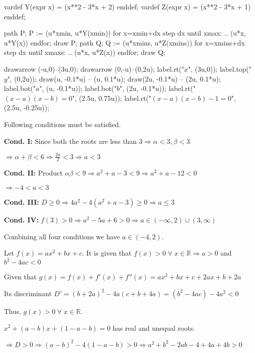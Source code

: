       vardef Y(expr x) = (x**2 - 3*x + 2) enddef;
      vardef Z(expr x) = (x**2 - 3*x + 1) enddef;

      path P;
      P := (u*xmin, u*Y(xmin))
      for x=xmin+dx step dx until xmax:
      .. (u*x, u*Y(x))
      endfor;
      draw P;
      path Q;
      Q := (u*xmins, u*Z(xmins))
      for x=xmins+dx step dx until xmaxs:
      .. (u*x, u*Z(x))
      endfor;
      draw Q;

      drawarrow (-u,0)--(3u,0);
      drawarrow (0,-u)--(0,2u);
      label.rt("$x$", (3u,0));
      label.top("$y$", (0,2u));
      draw(u, -0.1*u) -- (u, 0.1*u);
      draw(2u, -0.1*u) -- (2u, 0.1*u);
      label.bot("$a$", (u, -0.1*u));
      label.bot("$b$", (2u, -0.1*u));
      label.rt("$(x - a)(x - b) = 0$", (2.5u, 0.75u));
      label.rt("$(x - a)(x - b) - 1 = 0$", (2.5u, -0.25u));
    \stopMPcode
  \stopplacefigure
\item Following conditions must be satisfied.

  {\bf Cond. I:} Since both the roots are less than $3\Rightarrow \alpha < 3, \beta < 3$

  $\Rightarrow \alpha + \beta < 6 \Rightarrow \frac{2a}{2} < 3\Rightarrow a < 3$

  {\bf Cond. II:} Product $\alpha\beta < 9 \Rightarrow a^2 + a - 3 < 9 \Rightarrow a^2 + a - 12 <0$

  $\Rightarrow -4 < a < 3$

  {\bf Cond. III:} $D \geq 0 \Rightarrow 4a^2 - 4(a^2 + a - 3)\geq 0\Rightarrow a\leq 3$

  {\bf Cond. IV:} $f(3) > 0 \Rightarrow a^2 - 5a + 6 > 0 \Rightarrow a\in(-\infty, 2)\cup (3, \infty)$

  Combining all four conditions we have $a\in(-4, 2)$.
\item Let $f(x) = ax^2 + bx + c$. It is given that $f(x) > 0\;\forall\;x\in\mathbb{R}\Rightarrow a > 0$ and
  $b^2 - 4ac < 0$

  Given that $g(x) = f(x) + f'(x) + f''(x) = ax^2 + bx + c + 2ax + b + 2a$

  Its discriminant $D' = (b + 2a)^2 - 4a(c + b + 4a) = (b^2 - 4ac) - 4a^2 < 0$

  Thus, $g(x) > 0\;\forall\;x\in\mathbb{R}$.
\item $x^2 + (a - b)x + (1 - a - b) = 0$ has real and unequal roots.

  $\Rightarrow D > 0 \Rightarrow (a - b)^2 - 4(1 - a - b) > 0 \Rightarrow a^2 + b^2 - 2ab - 4 + 4a + 4b > 0$

